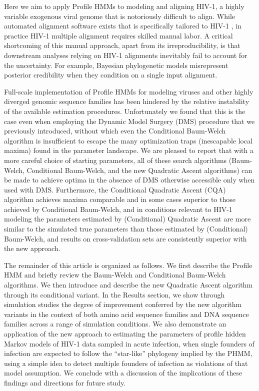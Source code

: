 \documentclass[preprint,12pt,authoryear]{elsarticle}
\begin{document}
Here we aim to apply Profile HMMs to modeling and aligning HIV-1, a highly variable exogenous viral genome that is notoriously difficult to align.  While automated alignment software exists that is specifically tailored to HIV-1 \citep{Gaschen01052001}, in practice HIV-1 multiple alignment requires skilled manual labor.  A critical shortcoming of this manual approach, apart from its irreproducibility, is that downstream analyses relying on HIV-1 alignments inevitably fail to account for the uncertainty.  For example, Bayesian phylogenetic models misrepresent posterior credibility when they condition on a single input alignment.


Full-scale implementation of Profile HMMs for modeling viruses and
other highly diverged genomic sequence families has been hindered by
the relative instability of the available estimation procedures.  Unfortunately we found that this is the case even when employing the Dynamic Model Surgery (DMS) procedure that we previously introduced, without which even the Conditional Baum-Welch algorithm is insufficient to escape the many optimization traps (inescapable local
maxima) found in the parameter landscape.  We are pleased to report
that with a more careful choice of starting parameters, all of these
search algorithms (Baum-Welch, Conditional Baum-Welch, and the new
Quadratic Ascent algorithms) can be made to achieve optima in the
absence of DMS otherwise accessible only when used with DMS.
Furthermore, the Conditional Quadratic Ascent (CQA) algorithm achieves
maxima comparable and in some cases superior to those achieved by Conditional
Baum-Welch, and in conditions relevant to HIV-1 modeling the parameters estimated by (Conditional) Quadratic
Ascent are more similar to the simulated true parameters than those
estimated by (Conditional) Baum-Welch, and results on cross-validation
sets are consistently superior with the new approach.

The remainder of this article is organized as follows.  We first
describe the Profile HMM and briefly review the Baum-Welch and Conditional Baum-Welch
algorithms.  We then introduce and describe the new Quadratic Ascent
algorithm through its conditional variant.  In the Results section, we
show through simulation studies the degree of improvement conferred by
the new algorithm variants in the context of both amino acid sequence
families and DNA sequence families across a range of simulation
conditions. We also demonstrate an application of the new approach to
estimating the parameters of profile hidden Markov models of HIV-1
data sampled in acute infection, when single founders of infection are
expected to follow the ``star-like'' phylogeny implied by the PHMM, using a simple idea to detect multiple founders of infection as violations of
that model assumption.  We conclude with a discussion of
the implications of these findings and directions for future study.
\end{document}
